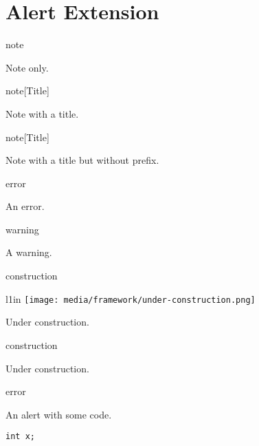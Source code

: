 
\chapter{\label{alert-extension}Alert Extension}
\begin{alert}[note]{note}

\par Note only.
\end{alert}

\begin{alert}[note]{note}[Title]

\par Note with a title.
\end{alert}

\begin{alert}[]{note}[Title]

\par Note with a title but without prefix.
\end{alert}

\begin{alert}[error]{error}

\par An error.
\end{alert}

\begin{alert}[warning]{warning}

\par A warning.
\end{alert}
\begin{alert}[construction]{construction}

\begin{wrapfigure}{l}{1in}
\texttt{[image: media/framework/under-construction.png]}
\end{wrapfigure}

\par Under construction.
\end{alert}
\begin{alert}[construction]{construction}

\par Under construction.
\end{alert}

\begin{alert}[error]{error}

\par An alert with some code.
\begin{verbatim}
int x;
\end{verbatim}

\end{alert}
